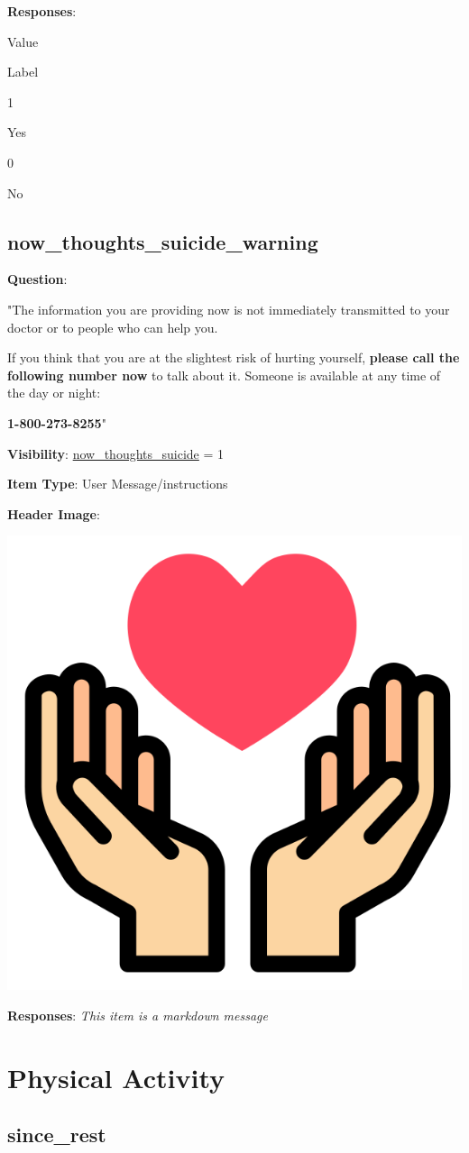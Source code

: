 \documentclass[]{book}
\begin{document}
\textbf{Responses}:

Value

Label

1

Yes

0

No

\hypertarget{now_thoughts_suicide_warning}{%
\section{now\_thoughts\_suicide\_warning}\label{now_thoughts_suicide_warning}}

\textbf{Question}:

"The information you are providing now is not immediately transmitted to your doctor or to people who can help you.

If you think that you are at the slightest risk of hurting yourself, \textbf{please call the following number now} to talk about it. Someone is available at any time of the day or night:

\textbf{1-800-273-8255}"

\textbf{Visibility}: \protect\hyperlink{now_thoughts_suicide}{now\_thoughts\_suicide} = 1

\textbf{Item Type}: User Message/instructions

\textbf{Header Image}:

\begin{flushleft}\includegraphics[width=0.33\linewidth]{downloadFigs4latex_NIMH_Applet_Codebook/now_thoughts_suicide_warning_headerImg} \end{flushleft}

\textbf{Responses}: \emph{This item is a markdown message}

\hypertarget{activity_section}{%
\chapter{Physical Activity}\label{activity_section}}

\hypertarget{since_rest}{%
\section{since\_rest}\label{since_rest}}
\end{document}
